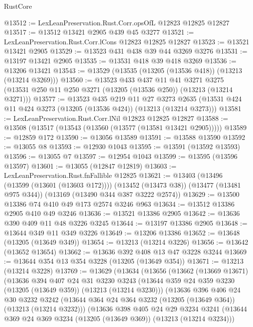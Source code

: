 \begin{lexlean}{RustCore}
\begin{coremodule}
@13512 := LexLeanPreservation.Rust.Corr.opsOfL @12823 @12825 @12827
@13517 := @13512 @13421 @2905 @439 @45 @3277
@13521 := LexLeanPreservation.Rust.Corr.lCons @12823 @12825 @12827
@13523 := @13521 @13421 @2905
@13529 := @13523 @431 @438 @39 @44 @3269 @3276
@13531 := @13197 @13421 @2905
@13535 := @13531 @418 @39 @418 @3269
@13536 := @13206 @13421
@13543 := @13529 (@13535 (@13205 (@13536 @418)) (@13213 (@13214 @3269)))
@13560 := @13523
    @433
    @437
    @11
    @41
    @3271
    @3275
    (@13531 @250 @11 @250 @3271 (@13205 (@13536 @250)) (@13213 (@13214 @3271)))
@13577 := @13523
    @435
    @219
    @11
    @27
    @3273
    @2635
    (@13531 @424 @11 @424 @3273 (@13205 (@13536 @424)) (@13213 (@13214 @3273)))
@13581 := LexLeanPreservation.Rust.Corr.lNil @12823 @12825 @12827
@13588 := @13508 (@13517 (@13543 (@13560 (@13577 (@13581 @13421 @2905)))))
@13589 := @12859 @172
@13590 := @13056 @13589
@13591 := @13588 @13590
@13592 := @13055 @8
@13593 := @12930 @1043
@13595 := @13591 (@13592 @13593)
@13596 := @13055 @7
@13597 := @12954 @1043
@13599 := @13595 (@13596 @13597)
@13601 := @13055 (@12847 @12819)
@13603 := LexLeanPreservation.Rust.fnFallible @12825
@13621 := @13403
    (@13496 (@13599 (@13601 (@13603 @172))))
    (@13452 (@13473 @38))
    (@13477 (@13481 @975 @344))
    (@13169 (@13490 @344 @387 @3222 @2574))
@13629 := @13500 @13386 @74 @410 @49 @173 @2574 @3246 @963
@13634 := @13512 @13386 @2905 @410 @49 @3246
@13636 := @13521 @13386 @2905
@13642 := @13636 @390 @409 @11 @48 @3226 @3245
@13644 := @13197 @13386 @2905
@13648 := @13644 @349 @11 @349 @3226
@13649 := @13206 @13386
@13652 := @13648 (@13205 (@13649 @349))
@13654 := @13213 (@13214 @3226)
@13656 := @13642 (@13652 @13654)
@13662 := @13636 @392 @408 @13 @47 @3228 @3244
@13669 := @13644 @354 @13 @354 @3228 (@13205 (@13649 @354))
@13671 := @13213 (@13214 @3228)
@13769 := @13629
    (@13634
      (@13656
        (@13662
          (@13669 @13671)
          (@13636
            @394
            @407
            @24
            @31
            @3230
            @3243
            (@13644 @359 @24 @359 @3230 (@13205 (@13649 @359)) (@13213 (@13214 @3230)))
            (@13636
              @396
              @406
              @24
              @30
              @3232
              @3242
              (@13644 @364 @24 @364 @3232 (@13205 (@13649 @364)) (@13213 (@13214 @3232)))
              (@13636
                @398
                @405
                @24
                @29
                @3234
                @3241
                (@13644 @369 @24 @369 @3234 (@13205 (@13649 @369)) (@13213 (@13214 @3234)))

\end{coremodule}
\end{lexlean}
